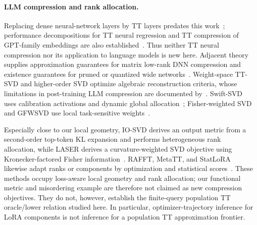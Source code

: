 \paragraph{LLM compression and rank allocation.}
Replacing dense neural-network layers by TT layers predates this work~\citep{novikov2015tensorizing}; performance decompositions for TT neural regression and TT compression of GPT-family embeddings are also established~\citep{qi2020ttdnn,tensorgpt2023}. Thus neither TT neural compression nor its application to language models is new here. Adjacent theory supplies approximation guarantees for matrix low-rank DNN compression and existence guarantees for pruned or quantized wide networks~\citep{zhang2025lowrankcompression,elcheairi2026compression}. Weight-space TT-SVD and higher-order SVD optimize algebraic reconstruction criteria, whose limitations in post-training LLM compression are documented by~\citet{zagitov2026rethinking}. Swift-SVD uses calibration activations and dynamic global allocation~\citep{swiftsvd2026}; Fisher-weighted SVD and GFWSVD use local task-sensitive weights~\citep{fisherweighted2022,gfwsvd2025}.

Especially close to our local geometry, IO-SVD derives an output metric from a second-order top-token KL expansion and performs heterogeneous rank allocation, while LASER derives a curvature-weighted SVD objective using Kronecker-factored Fisher information~\citep{iosvd2026,laser2026}. RAFFT, MetaTT, and StatLoRA likewise adapt ranks or components by optimization and statistical scores~\citep{rafft2026,metatt2025,statlora2026}. These methods occupy loss-aware local geometry and rank allocation; our functional metric and misordering example are therefore not claimed as new compression objectives. They do not, however, establish the finite-query population TT oracle/lower relation studied here. In particular, optimizer-trajectory inference for LoRA components is not inference for a population TT approximation frontier.

